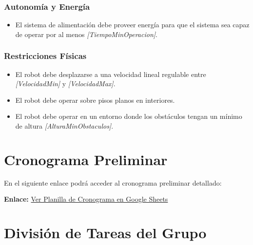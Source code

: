 \documentclass[12pt,a4paper]{article}
\begin{document}
\subsubsection{Autonomía y Energía}
\begin{itemize}
    \item El sistema de alimentación debe proveer energía para que el sistema sea capaz de operar por al menos \textit{[TiempoMinOperacion]}.
\end{itemize}

\subsubsection{Restricciones Físicas}
\begin{itemize}
    \item El robot debe desplazarse a una velocidad lineal regulable entre \textit{[VelocidadMin]} y \textit{[VelocidadMax]}.
    \item El robot debe operar sobre pisos planos en interiores.
    \item El robot debe operar en un entorno donde los obstáculos tengan un mínimo de altura \textit{[AlturaMinObstaculos]}.
\end{itemize}
\section{Cronograma Preliminar}

\begin{tcolorbox}[colframe=green!60!black, colback=green!5!white, arc=2mm, title=\textbf{Cronograma (Google Sheets)}]
  En el siguiente enlace podrá acceder al cronograma preliminar detallado:
  \vspace{0.2cm}

  \textbf{Enlace:} \href{https://docs.google.com/spreadsheets/d/1GAEeQZzlFaMgwrWLOeSPeK0nOuYQg2peXEuDazYDfk4/edit?usp=sharing}{Ver Planilla de Cronograma en Google Sheets}
\end{tcolorbox}

\section{División de Tareas del Grupo}
\end{document}
